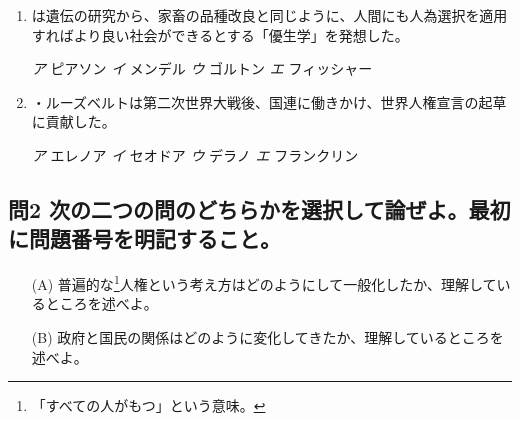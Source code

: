 \documentclass[uplatex,dvipdfmx]{jsarticle}
\newcommand{\sentakusi}[4]{
\hspace{.3zw}
\emph{ア}\hspace{1zw} #1 \hspace{2zw} \emph{イ} \hspace{1zw}#2 \hspace{2zw}\emph{ウ}\hspace{1zw} #3 \hspace{2zw}\emph{エ}\hspace{1zw} #4

}
\begin{document}
\begin{enumerate}
\sentakusi
{キェルケゴール協会}
{ケンブリッジ協会}
{フェビアン協会}
{ブルームズベリー・グループ}


\item   {}は遺伝の研究から、家畜の品種改良と同じように、人間にも人為選択を適用すればより良い社会ができるとする「優生学」を発想した。

\sentakusi
{ピアソン}
{メンデル}
{ゴルトン}
{フィッシャー}






\item   {}・ルーズベルトは第二次世界大戦後、国連に働きかけ、世界人権宣言の起草に貢献した。

\sentakusi
{エレノア}
{セオドア}
{デラノ}
{フランクリン}







\end{enumerate}







\subsection*{問2 次の二つの問のどちらかを選択して論ぜよ。最初に問題番号を明記すること。}


\begin{itemize}
\item [(A)]普遍的な\footnote{「すべての人がもつ」という意味。}人権という考え方はどのようにして一般化したか、理解しているところを述べよ。
\item [(B)] 政府と国民の関係はどのように変化してきたか、理解しているところを述べよ。
\end{itemize}
\end{document}
